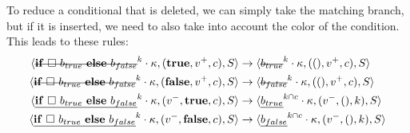 \documentclass[a4paper,11pt]{article}
\newcommand\mathst[1]{\text{\st{$#1$}}}
\newcommand\mathul[1]{\text{\ul{$#1$}}}
\newcommand\rtstate[3]{\langle #1, #2, #3\rangle}
\begin{document}
To reduce a conditional that is deleted, we can simply take the matching branch, but if it is inserted, we need to also take into account the color of the condition. This leads to these rules:
\begin{align*}
\rtstate{\mathst{\mathbf{if}\ \square\ b_{true}\ \mathbf{else}\ b_{false}}^k \cdot  \kappa}{(\mathbf{true}, v^+, c)}{S} &\rightarrow \rtstate{\mathst{b_{true}}^k \cdot \kappa}{((), v^+, c)}{S}\\
\rtstate{\mathst{\mathbf{if}\ \square\ b_{true}\ \mathbf{else}\ b_{false}}^k \cdot  \kappa}{(\mathbf{false}, v^+, c)}{S} &\rightarrow \rtstate{\mathst{b_{false}}^k \cdot \kappa}{((), v^+, c)}{S}\\
\rtstate{\mathul{\mathbf{if}\ \square\ b_{true}\ \mathbf{else}\ b_{false}}^k \cdot \kappa}{(v^-, \mathbf{true}, c)}{S} &\rightarrow \rtstate{\mathul{b_{true}}^{k \cap c} \cdot \kappa}{(v^-, (), k)}{S}\\
\rtstate{\mathul{\mathbf{if}\ \square\ b_{true}\ \mathbf{else}\ b_{false}}^k \cdot \kappa}{(v^-, \mathbf{false}, c)}{S} &\rightarrow \rtstate{\mathul{b_{false}}^{k \cap c} \cdot \kappa}{(v^-, (), k)}{S}\\
\end{align*}
\end{document}
